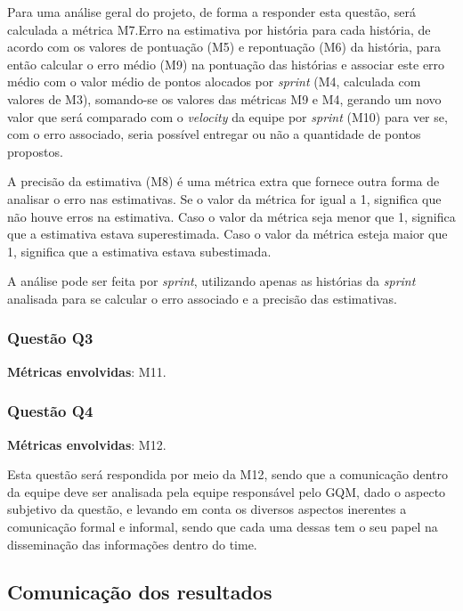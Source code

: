   			Para uma análise geral do projeto, de forma a responder esta questão, será calculada a métrica M7.Erro na estimativa por história para cada história, de acordo com os valores
  			de pontuação (M5) e repontuação (M6) da história, para então calcular o erro médio (M9) na pontuação das histórias e associar
  			este erro médio com o valor médio de pontos alocados por \textit{sprint} (M4, calculada com valores de M3), somando-se os valores
  			das métricas M9 e M4, gerando um novo valor que será comparado com o \textit{velocity} da equipe por \textit{sprint} (M10) para ver se, com o erro associado, seria possível entregar ou não a quantidade de pontos propostos.

  			A precisão da estimativa (M8) é uma métrica extra que fornece outra forma de analisar o erro nas estimativas. Se o valor da métrica
  			for igual a 1, significa que não houve erros na estimativa. Caso o valor da métrica seja menor que 1, significa que a estimativa estava
  			superestimada. Caso o valor da métrica esteja maior que 1, significa que a estimativa estava subestimada.

  			A análise pode ser feita por \textit{sprint}, utilizando apenas as histórias da \textit{sprint} analisada para se calcular o erro associado e a precisão das estimativas.
	
	\subsubsection{Questão Q3}
	
		\textbf{Métricas envolvidas}: M11.

		
	\subsubsection{Questão Q4}

		\textbf{Métricas envolvidas}: M12.
		
		Esta questão será respondida por meio da M12, sendo que a comunicação dentro da equipe deve ser analisada pela
		equipe responsável pelo GQM, dado o aspecto subjetivo da questão, e levando em conta os diversos aspectos 
		inerentes a comunicação formal e informal, sendo que cada uma dessas tem o seu papel na disseminação das 
		informações dentro do time.
      
      \subsection{Comunicação dos resultados}